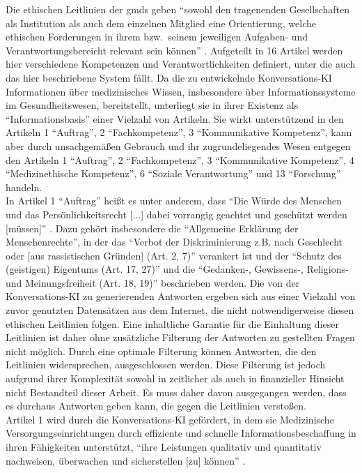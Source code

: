 Die ethischen Leitlinien der \ac{gmds} \citep{gmds_eth} geben \enquote{sowohl den tragenenden Gesellschaften als Institution als auch dem einzelnen Mitglied eine Orientierung,
welche ethischen Forderungen in ihrem bzw.\ seinem jeweiligen Aufgaben- und Verantwortungsbereicht relevant sein können} \citep{gmds_eth}.
Aufgeteilt in 16 Artikel werden hier verschiedene Kompetenzen und Verantwortlichkeiten definiert, unter die auch das hier beschriebene System fällt.
Da die zu entwickelnde Konversations-KI Informationen über medizinisches Wissen, insbesondere über Informationssysteme im Gesundheitswesen, bereitstellt,
unterliegt sie in ihrer Existenz als \enquote{Informationsbasis} einer Vielzahl von Artikeln.
Sie wirkt unterstützend in den Artikeln 1 \enquote{Auftrag}, 2 \enquote{Fachkompetenz}, 3 \enquote{Kommunikative Kompetenz}, 
kann aber durch unsachgemäßen Gebrauch und ihr zugrundeliegendes Wesen entgegen den Artikeln 1 \enquote{Auftrag}, 2 \enquote{Fachkompetenz}, 3 \enquote{Kommunikative Kompetenz},
4 \enquote{Medizinethische Kompetenz}, 6 \enquote{Soziale Verantwortung} und 13 \enquote{Forschung} handeln.\\

In Artikel 1 \enquote{Auftrag} heißt es unter anderem, dass 
\enquote{Die Würde des Menschen und das Persönlichkeitsrecht [$\dots$] dabei vorrangig geachtet und geschützt werden [müssen]} \citep{gmds_eth}.
Dazu gehört insbesondere die \enquote{Allgemeine Erklärung der Menschenrechte},
in der das \enquote{Verbot der Diskriminierung z.B. nach Geschlecht oder [aus rassistischen Gründen] (Art. 2, 7)}
verankert ist und
der \enquote{Schutz des (geistigen) Eigentums (Art. 17, 27)} und die \enquote{Gedanken-, Gewissens-, Religions- und Meinungsfreiheit (Art. 18, 19)} beschrieben werden.
Die von der Konversations-KI zu generierenden Antworten ergeben sich aus einer Vielzahl von zuvor genutzten Datensätzen aus dem Internet, die nicht notwendigerweise diesen ethischen Leitlinien folgen.
Eine inhaltliche Garantie für die Einhaltung dieser Leitlinien ist daher ohne zusätzliche Filterung der Antworten zu gestellten Fragen nicht möglich. 
Durch eine optimale Filterung können Antworten, die den Leitlinien widersprechen, ausgeschlossen werden. 
Diese Filterung ist jedoch aufgrund ihrer Komplexität sowohl in zeitlicher als auch in finanzieller Hinsicht nicht Bestandteil dieser Arbeit.
Es muss daher davon ausgegangen werden, dass es durchaus Antworten geben kann, die gegen die Leitlinien verstoßen.\\

Artikel 1 wird durch die Konversations-KI gefördert, in dem sie Medizinische Versorgungseinrichtungen durch effiziente und schnelle Informationsbeschaffung in ihren Fähigkeiten unterstützt, 
\enquote{ihre Leistungen qualitativ und quantitativ nachweisen, überwachen und sicherstellen [zu] können} \citep{gmds_eth}.\\

